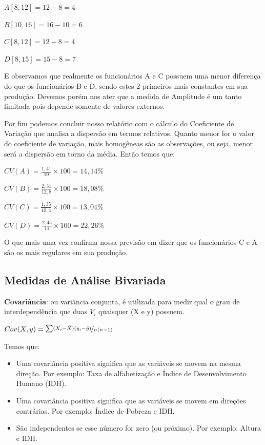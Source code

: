 \documentclass[a4paper,11pt]{article}
\begin{document}
$ A[8,12] = 12 - 8 = 4$

$ B[10,16] = 16 - 10 = 6$

$ C[8,12] = 12 - 8 = 4$

$ D[8,15] = 15 - 8 = 7$

E observamos que realmente os funcionários A e C possuem uma menor diferença do que os funcionários B e D, sendo estes 2 primeiros mais constantes em sua produção. Devemos porém nos ater que a medida de Amplitude é um tanto limitada pois depende somente de valores externos. 

Por fim podemos concluir nosso relatório com o cálculo do Coeficiente de Variação que analisa a dispersão em termos relativos. Quanto menor for o valor do coeficiente de variação, mais homogêneas são as observações, ou seja, menor será a dispersão em torno da média. Então temos que:

$ CV(A) = \frac{1,41}{10} \times 100 = 14,14\%$

$ CV(B) = \frac{2,31}{12,8} \times 100 = 18,08\%$

$ CV(C) = \frac{1,35}{10,4} \times 100 = 13,04\%$

$ CV(D) = \frac{2,45}{11} \times 100 = 22,26\%$

O que mais uma vez confirma nossa previsão em dizer que os funcionários C e A são os mais regulares em sua produção.

\subsection{Medidas de Análise Bivariada}

\textbf{Covariância}: ou variância conjunta, é utilizada para medir qual o grau de interdependência que duas $V_{i}$ quaisquer (X e y) possuem.

$Cov(X,y) =  \nicefrac{\sum (X_{i} - \bar{X})(y_{i} - \bar{y})}{n(n -1)}$

Temos que: \vspace{-1em}
\begin{itemize}
	\item Uma covariância positiva significa que as variáveis se movem na mesma direção. Por exemplo: Taxa de alfabetização e Índice de Desenvolvimento Humano (IDH).
	\item Uma covariância positiva significa que as variáveis se movem em direções contrárias. Por exemplo: Índice de Pobreza e IDH.
	\item São independentes se esse número for zero (ou próximo). Por exemplo: Altura e IDH.
\end{itemize}
\end{document}
